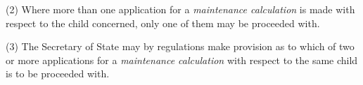 \documentclass[12pt,a4paper]{article}
\begin{document}
(2) Where more than one application for a 
\emph{maintenance calculation}  %
is made with respect to the child concerned, only one of them may be proceeded with.

(3) The Secretary of State may by regulations make provision as to which of two or more applications for a 
\emph{maintenance calculation}  %
with respect to the same child is to be proceeded with.

\end{document}

